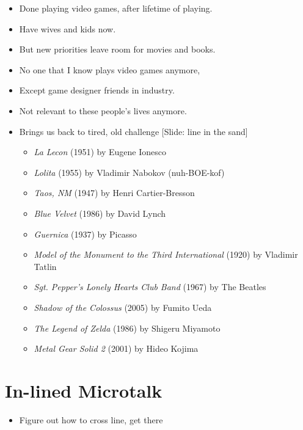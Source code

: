 \documentclass[12pt]{article}
\begin{document}
{\begin{itemize}
\item Done playing video games, after lifetime of playing.  

\item Have wives and kids now.  

\item But new priorities leave room for movies and books.

\item No one that I know plays video games anymore, 

\item Except game designer friends in industry.


\item Not relevant to these people's lives anymore.


\newpage
\item Brings us back to tired, old challenge [Slide:  line in the sand] {\large \begin{itemize}
\item {\it La Lecon} (1951) by Eugene Ionesco
\item {\it Lolita} (1955) by Vladimir Nabokov (nuh-BOE-kof)
\item {\it Taos, NM} (1947) by Henri Cartier-Bresson
\item {\it Blue Velvet} (1986) by David Lynch
\item {\it Guernica} (1937) by Picasso
\item {\it Model of the Monument to the Third International} (1920) by Vladimir Tatlin
\item {\it Sgt. Pepper's Lonely Hearts Club Band} (1967) by The Beatles
\item {\it Shadow of the Colossus} (2005) by Fumito Ueda
\item {\it The Legend of Zelda} (1986) by Shigeru Miyamoto
\item {\it Metal Gear Solid 2} (2001) by Hideo Kojima 
\end{itemize} }

\end{itemize}




\section{In-lined Microtalk}

\begin{itemize}

\item Figure out how to cross line, get there


\end{itemize}}
\end{document}
